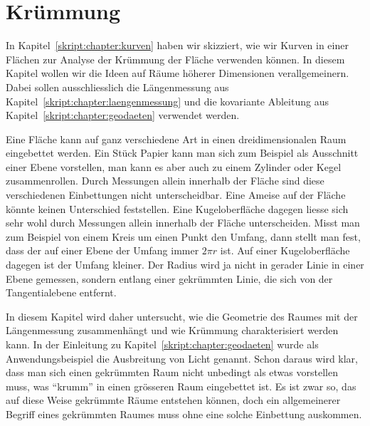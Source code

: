 %
%
%
\chapter{Krümmung%
\label{skript:chapter:kruemmung}}
\rhead{}

In Kapitel~\ref{skript:chapter:kurven} haben wir skizziert, wie wir
Kurven in einer Flächen zur Analyse der Krümmung der Fläche verwenden
können.
In diesem Kapitel wollen wir die Ideen auf Räume höherer Dimensionen
verallgemeinern.
Dabei sollen ausschliesslich die Längenmessung aus
Kapitel~\ref{skript:chapter:laengenmessung} und die kovariante Ableitung
aus Kapitel~\ref{skript:chapter:geodaeten} verwendet werden.

Eine Fläche kann auf ganz verschiedene Art in
einen dreidimensionalen Raum eingebettet werden.
Ein Stück Papier kann man sich zum Beispiel als Ausschnitt einer
Ebene vorstellen, man kann es aber auch zu einem Zylinder oder
Kegel zusammenrollen.
Durch Messungen allein innerhalb der Fläche sind diese verschiedenen
Einbettungen nicht unterscheidbar.
Eine Ameise auf der Fläche könnte keinen Unterschied feststellen.
Eine Kugeloberfläche dagegen liesse sich sehr wohl durch Messungen
allein innerhalb der Fläche unterscheiden.
Misst man zum Beispiel von einem Kreis um einen Punkt den Umfang,
dann stellt man fest, dass der auf einer Ebene der Umfang immer $2\pi r$ ist.
Auf einer Kugeloberfläche dagegen ist der Umfang kleiner.
Der Radius wird ja nicht in gerader Linie in einer Ebene gemessen,
sondern entlang einer gekrümmten Linie, die sich von der Tangentialebene
entfernt.

In diesem Kapitel wird daher untersucht, wie die Geometrie des Raumes
mit der Längenmessung zusammenhängt und wie Krümmung charakterisiert
werden kann.
In der Einleitung zu Kapitel~\ref{skript:chapter:geodaeten} wurde
als Anwendungsbeispiel die Ausbreitung von Licht genannt.
Schon daraus wird klar, dass man sich einen gekrümmten
Raum nicht unbedingt als etwas vorstellen muss, was ``krumm'' in einen
grösseren Raum eingebettet ist. 
Es ist zwar so, das auf diese Weise gekrümmte Räume entstehen können,
doch ein allgemeinerer Begriff eines gekrümmten Raumes muss ohne eine
solche Einbettung auskommen.




